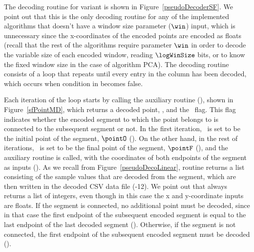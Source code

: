 \vspace{+5pt}
The decoding routine for variant \maskalgo is shown in Figure~\ref{pseudoDecoderSF}. We point out that this is the only decoding routine for any of the implemented algorithms that doesn't have a window size parameter ($\win$) input, which is unnecessary since the x-coordinates of the encoded points are encoded as floats (recall that the rest of the algorithms require parameter $\win$ in order to decode the variable size of each encoded window, reading $\logWinSize$ bits, or to know the fixed window size in the case of algorithm PCA). The decoding routine consists of a loop that repeats until every entry in the column has been decoded, which occurs when condition in  becomes false. 





\clearpage


Each iteration of the loop starts by calling the auxiliary routine \SFDecodePoint (), shown in Figure~\ref{sfPointMD}, which returns a decoded point, \pointP, and the \connected\ flag. This flag indicates whether the encoded segment to which the point belongs to is connected to the subsequent segment or not.  In the first iteration, \pointP\ is set to be the initial point of the segment, $\pointO$ (). On the other hand, in the rest of iterations, \pointP\ is set to be the final point of the segment, $\pointF$ (), and the auxiliary routine \decodeSegment is called, with the coordinates of both endpoints of the segment as inputs (). As we recall from Figure~\ref{pseudoDecoLinear}, routine \decodeSegment returns a list consisting of the sample values that are decoded from the segment, which are then written in the decoded CSV data file (-12). We point out that \decodeSegment always returns a list of integers, even though in this case the x and y-coordinate inputs are floats. If the segment is connected, no additional point must be decoded, since in that case the first endpoint of the subsequent encoded segment is equal to the last endpoint of the last decoded segment (). Otherwise, if the segment is not connected, the first endpoint of the subsequent encoded segment must be decoded ().




        


